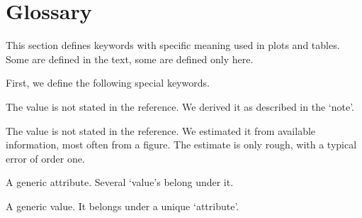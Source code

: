 \documentclass[aps, prx, showpacs, twocolumn, superscriptaddress, notitlepage, longbibliography, floatfix, nofootinbib]{revtex4-2}
\newcommand{\estimated}{\textit{(estimated) }}
\newcommand{\derived}{\textit{(derived) }}
\newif\ifFirstTableOnly
\newcommand{\myKey}[1]{$\whitearrowupfrombar$\textit{#1}}
\renewcommand{\myKey}[1]{\textit{#1}}
\renewcommand{\myKey}[1]{`{#1}'}
\newcommand{\key}[1]{$\whitearrowupfrombar$\textit{#1}}
\newcommand{\val}[1]{\rotatebox[origin=c]{180}{$\whitearrowupfrombar$}\textit{#1}}
\renewcommand{\key}[1]{\myKey{#1}}
\renewcommand{\val}[1]{\myKey{#1}}
\newcommand{\separate}[1]
{
 #1
}
\begin{document}
\begin{widetext}
\renewcommand\thetable{\Roman{table}}
\addtocounter{table}{-1}\label{tab:qualityFactors}

\renewcommand\thetable{\Roman{table}-\arabic{subtable}}
\setcounter{subtable}{1}


\addtocounter{table}{-1}
\addtocounter{subtable}{+1}


\addtocounter{table}{+1}



\renewcommand\thetable{\Roman{table}}
\addtocounter{table}{-1}\label{tab:qubitArrays}

\renewcommand\thetable{\Roman{table}-\arabic{subtable}}
\setcounter{subtable}{1}


\addtocounter{table}{-1}
\addtocounter{subtable}{+1}

\ifFirstTableOnly \else

\addtocounter{table}{-1}
\addtocounter{subtable}{+1}
\fi

\addtocounter{table}{+1}

\renewcommand\thetable{\Roman{table}}

\phantom{x}

\end{widetext}

\renewcommand{\separate}[1]
{
 \vspace{0.5cm}
  \vspace{0.5cm}
  \noindent 
 #1
 \vspace{0.5cm}
  \vspace{0.5cm}
}

\section{Glossary}

\label{sec:vocabulary}

\newcommand{\keyword}[2]{\myKey{#1}. #2\\}

This section defines keywords with specific meaning used in plots and tables. Some are defined in the text, some are defined only here. 

\separate{First, we define the following special keywords.}

\begin{description}[leftmargin=5mm, topsep=0mm]
\item[\val{\derived}] The value is not stated in the reference.  We derived it as described in the \val{note}.
\item[\val{\estimated}] The value is not stated in the reference. We estimated it from available information, most often from a figure. The estimate is only rough, with a typical error of order one.
\item[\key{attribute}] A generic attribute. Several \val{value}s belong under it.
\item[\key{value}] A generic value. It belongs under a unique \val{attribute}.
\end{description}
\end{document}
